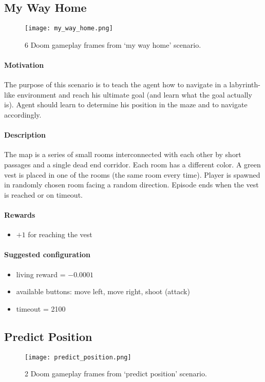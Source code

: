 	\subsection{My Way Home}
		\begin{figure}
			\centering
			\texttt{[image: my\_way\_home.png]}
			\caption{6 Doom gameplay frames from `my way home' scenario.}\label{fig:my_way_home}
		\end{figure}
		\paragraph{Motivation} 
			The purpose of this scenario is to teach the agent how to navigate in a labyrinth-like environment and reach his ultimate goal (and learn what the goal actually is). Agent should learn to determine his position in the maze and to navigate accordingly.

		\paragraph{Description}
			The map is a series of small rooms interconnected with each other by short passages and a single dead end corridor. Each room has a different color. A green vest is placed in one of the rooms (the same room every time). Player is spawned in randomly chosen room facing a random direction. Episode ends when the vest is reached or on timeout.
		\paragraph{Rewards}

		\begin{itemize}
			\item $+1$ for reaching the vest
		\end{itemize}
		
		\paragraph{Suggested configuration}
		\begin{itemize}
			\item living reward = $-0.0001$
			\item available buttons: move left, move right, shoot (attack)
			\item timeout = 2100
		\end{itemize}
	\newpage

	\subsection{Predict Position}
		\begin{figure}
			\centering
			\texttt{[image: predict\_position.png]}
			\caption{2 Doom gameplay frames from `predict position' scenario.}\label{fig:predict_position}
		\end{figure}
